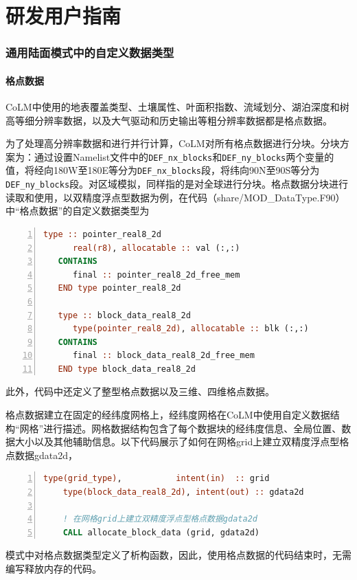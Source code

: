 \part{研发用户指南}

\section{通用陆面模式中的自定义数据类型}

\subsection{格点数据}
CoLM中使用的地表覆盖类型、土壤属性、叶面积指数、流域划分、湖泊深度和树高等细分辨率数据，以及大气驱动和历史输出等粗分辨率数据都是格点数据。

为了处理高分辨率数据和进行并行计算，CoLM对所有格点数据进行分块。分块方案为：通过设置Namelist文件中的\texttt{DEF\_nx\_blocks}和\texttt{DEF\_ny\_blocks}两个变量的值，将经向180\textdegree W至180\textdegree E等分为\texttt{DEF\_nx\_blocks}段，将纬向90\textdegree N至90\textdegree S等分为\texttt{DEF\_ny\_blocks}段。对区域模拟，同样指的是对全球进行分块。格点数据分块进行读取和使用，以双精度浮点型数据为例，在代码（share/MOD\_DataType.F90）中“格点数据”的自定义数据类型为
\begin{lstlisting}[language=fortran, basicstyle=\linespread{1.0}\footnotesize\ttfamily, commentstyle=\color{olive}, numbers=left, numberstyle=\tiny, xleftmargin=1.5em,xrightmargin=0em, aboveskip=1em]
   type :: pointer_real8_2d
      real(r8), allocatable :: val (:,:)
   CONTAINS
      final :: pointer_real8_2d_free_mem
   END type pointer_real8_2d

   type :: block_data_real8_2d
      type(pointer_real8_2d), allocatable :: blk (:,:)
   CONTAINS
      final :: block_data_real8_2d_free_mem
   END type block_data_real8_2d
\end{lstlisting}
此外，代码中还定义了整型格点数据以及三维、四维格点数据。

格点数据建立在固定的经纬度网格上，经纬度网格在CoLM中使用自定义数据结构“网格”进行描述。网格数据结构包含了每个数据块的经纬度信息、全局位置、数据大小以及其他辅助信息。以下代码展示了如何在网格grid上建立双精度浮点型格点数据gdata2d，
\begin{lstlisting}[language=fortran, basicstyle=\linespread{1.0}\footnotesize\ttfamily, commentstyle=\color{olive}, numbers=left, numberstyle=\tiny, xleftmargin=1.5em,xrightmargin=0em, aboveskip=1em]
    type(grid_type),           intent(in)  :: grid
    type(block_data_real8_2d), intent(out) :: gdata2d

    ! 在网格grid上建立双精度浮点型格点数据gdata2d
    CALL allocate_block_data (grid, gdata2d)
\end{lstlisting}
模式中对格点数据类型定义了析构函数，因此，使用格点数据的代码结束时，无需编写释放内存的代码。

